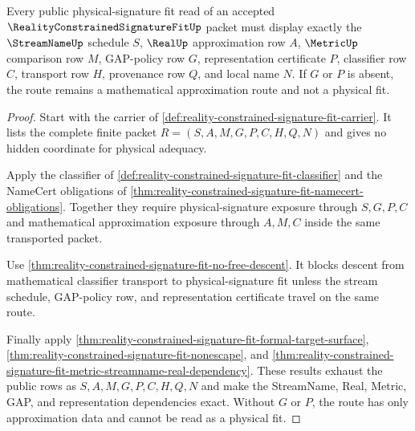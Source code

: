 \begin{theorem}
\label{thm:reality-constrained-signature-fit-gap-policy-exactness}
Every public physical-signature fit read of an accepted $\RealityConstrainedSignatureFitUp$ packet must display exactly the $\StreamNameUp$ schedule $S$, $\RealUp$ approximation row $A$, $\MetricUp$ comparison row $M$, GAP-policy row $G$, representation certificate $P$, classifier row $C$, transport row $H$, provenance row $Q$, and local name $N$. If $G$ or $P$ is absent, the route remains a mathematical approximation route and not a physical fit.
\end{theorem}
\begin{proof}
Start with the carrier of \autoref{def:reality-constrained-signature-fit-carrier}. It lists the complete finite packet $R=(S,A,M,G,P,C,H,Q,N)$ and gives no hidden coordinate for physical adequacy.

Apply the classifier of \autoref{def:reality-constrained-signature-fit-classifier} and the NameCert obligations of \autoref{thm:reality-constrained-signature-fit-namecert-obligations}. Together they require physical-signature exposure through $S,G,P,C$ and mathematical approximation exposure through $A,M,C$ inside the same transported packet.

Use \autoref{thm:reality-constrained-signature-fit-no-free-descent}. It blocks descent from mathematical classifier transport to physical-signature fit unless the stream schedule, GAP-policy row, and representation certificate travel on the same route.

Finally apply \autoref{thm:reality-constrained-signature-fit-formal-target-surface}, \autoref{thm:reality-constrained-signature-fit-nonescape}, and \autoref{thm:reality-constrained-signature-fit-metric-streamname-real-dependency}. These results exhaust the public rows as $S,A,M,G,P,C,H,Q,N$ and make the StreamName, Real, Metric, GAP, and representation dependencies exact. Without $G$ or $P$, the route has only approximation data and cannot be read as a physical fit.
\end{proof}



